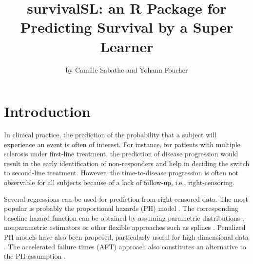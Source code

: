 \title{survivalSL: an R Package for Predicting Survival by a Super Learner}


\author{by Camille Sabathe and Yohann Foucher}

\maketitle


\let\proglang=\textsf
\newcommand{\class}[1]{'\code{#1}'}
\newcommand{\fct}[1]{\code{#1()}}
\newcommand{\deriv}{\mathrm{d}}
\newcommand{\prob}{\mathbb{P}}
\newcommand{\loss}{\mathrm{L}}
\newcommand{\ic}{$\mathrm{IC}_{95\%}$}
\newcommand{\transp}{^{\top}}
\newcommand{\esp}{\mathbb{E}}
\newcommand{\indic}{\mathbb{1}}
\newcommand{\argmin}{\mathop{\mathrm{argmin}}}
\newcommand{\argmax}{\mathop{\mathrm{argmax}}}

\hypertarget{introduction}{%
\section{Introduction}\label{introduction}}

In clinical practice, the prediction of the probability that a subject will experience an event is often of interest. For instance, for patients with multiple sclerosis under first-line treatment, the prediction of disease progression would result in the early identification of non-responders and help in deciding the switch to second-line treatment. However, the time-to-disease progression is often not observable for all subjects because of a lack of follow-up, i.e., right-censoring.

Several regressions can be used for prediction from right-censored data. The most popular is probably the proportional hazards (PH) model \citep{cox_regression_1972}. The corresponding baseline hazard function can be obtained by assuming parametric distributions \citep{andersenCountingProcessModels1985}, nonparametric estimators \citep{linBreslowEstimator2007} or other flexible approaches such as splines \citep{rosenbergHazardFunctionEstimation1995}. Penalized PH models have also been proposed, particularly useful for high-dimensional data \citep{goemanPenalizedEstimationCox2009}. The accelerated failure times (AFT) approach also constitutes an alternative to the PH assumption \citep{wei_accelerated_1992}.

